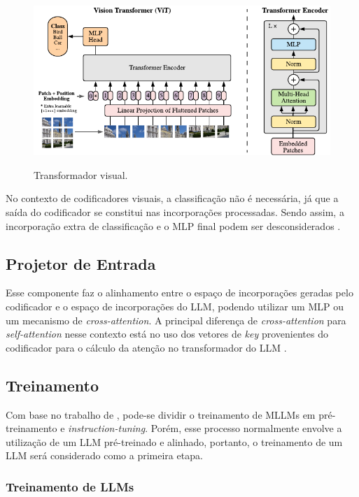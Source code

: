 \begin{figure}[ht]
      \centering
      \caption{\small Transformador visual.}
      \includegraphics[width=0.8\columnwidth,keepaspectratio]{images/vision_transformer.pdf}
      \label{fig:vision_transformer}
\end{figure}

No contexto de codificadores visuais, a classificação não é necessária, já que a saída do codificador se constitui nas incorporações processadas. Sendo assim, a
incorporação extra de classificação e o \ac{MLP} final podem ser desconsiderados \cite{dubey2024llama}.

\subsection{Projetor de Entrada}

Esse componente faz o alinhamento entre o espaço de incorporações geradas pelo codificador e o espaço de incorporações do \ac{LLM}, podendo utilizar um \ac{MLP} ou um
mecanismo de \textit{cross-attention}. A principal diferença de \textit{cross-attention} para \textit{self-attention} nesse contexto está no uso dos vetores de
\textit{key} provenientes do codificador para o cálculo da atenção no transformador do \ac{LLM} \cite{mllm_survey_2024}.

\subsection{Treinamento}

Com base no trabalho de \textcite{mllm_survey_2024}, pode-se dividir o treinamento de \acp{MLLM} em pré-treinamento e \textit{instruction-tuning}. Porém, esse processo
normalmente envolve a utilização de um \ac{LLM} pré-treinado e alinhado, portanto, o treinamento de um \ac{LLM} será considerado como a primeira etapa.

\subsubsection{Treinamento de LLMs}

